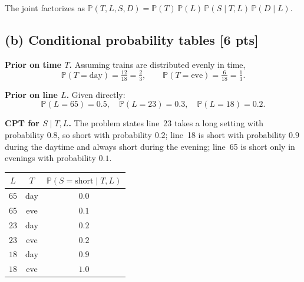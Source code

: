 \documentclass[12pt]{article}
\newcommand{\Prb}{\mathbb{P}}
\begin{document}
\begin{center}
\end{center}
The joint factorizes as $\Prb(T,L,S,D)=\Prb(T)\,\Prb(L)\,\Prb(S\mid T,L)\,\Prb(D\mid L)$.

\subsection*{(b) Conditional probability tables [6 pts]}

\textbf{Prior on time $T$.} Assuming trains are distributed evenly in time,
\[
  \Prb(T=\text{day})=\tfrac{12}{18}=\tfrac{2}{3},\qquad \Prb(T=\text{eve})=\tfrac{6}{18}=\tfrac{1}{3}.
\]

\textbf{Prior on line $L$.} Given directly:
\[
  \Prb(L=65)=0.5,\quad \Prb(L=23)=0.3,\quad \Prb(L=18)=0.2.
\]

\textbf{CPT for $S\mid T,L$.} The problem states line~23 takes a long setting with probability $0.8$, so short with probability $0.2$; line~18 is short with probability $0.9$ during the daytime and always short during the evening; line~65 is short only in evenings with probability $0.1$.
\begin{center}
\begin{tabular}{ccc}
\toprule
$L$ & $T$ & $\Prb(S=\text{short}\mid T,L)$ \\
\midrule
$65$ & day & $0.0$ \\
$65$ & eve & $0.1$ \\
$23$ & day & $0.2$ \\
$23$ & eve & $0.2$ \\
$18$ & day & $0.9$ \\
$18$ & eve & $1.0$ \\
\bottomrule
\end{tabular}
\end{center}
\end{document}
